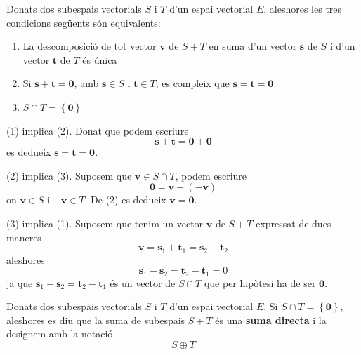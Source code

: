 \begin{teorema}
Donats dos subespais vectorials $S$ i $T$ d’un espai
vectorial $E$, aleshores les tres condicions següents són
equivalents:

\begin{enumerate}
\item La descomposició de tot vector $\mathbf{v}$ de $S+%
T$ en suma d’un vector $\mathbf{s}$ de $S$ i d’un vector 
$\mathbf{t}$ de $T$ és única

\item Si $\mathbf{s}+\mathbf{t}=\mathbf{0}$, amb $\mathbf{s}\in S$
i $\mathbf{t}\in T$, es compleix que $\mathbf{s}=\mathbf{t}=\mathbf{0}
$

\item $S\cap T=\left\{ \mathbf{0}\right\} $
\end{enumerate}

\end{teorema}
\begin{prova}
(1) implica (2). Donat que podem escriure%
\begin{equation*}
\mathbf{s}+\mathbf{t}=\mathbf{0}+\mathbf{0}
\end{equation*}%
es dedueix $\mathbf{s}=\mathbf{t}=\mathbf{0}$.

(2) implica (3). Suposem que $\mathbf{v}\in S\cap T$,
podem escriure%
\begin{equation*}
\mathbf{0}=\mathbf{v}+(-\mathbf{v})
\end{equation*}%
on $\mathbf{v}\in S$ i $-\mathbf{v}\in T$. De (2) es
dedueix $\mathbf{v}=\mathbf{0}$.

(3) implica (1). Suposem que tenim un vector $\mathbf{v}$ de $S%
+T$ expressat de dues maneres%
\begin{equation*}
\mathbf{v}=\mathbf{s}_{1}+\mathbf{t}_{1}=\mathbf{s}_{2}+\mathbf{t}_{2}
\end{equation*}%
aleshores%
\begin{equation*}
\mathbf{s}_{1}-\mathbf{s}_{2}=\mathbf{t}_{2}-\mathbf{t}_{1}=0
\end{equation*}%
ja que $\mathbf{s}_{1}-\mathbf{s}_{2}=\mathbf{t}_{2}-\mathbf{t}_{1}$ és un
vector de $S\cap T$ que per hipòtesi ha de ser $%
\mathbf{0}$.
\end{prova}

\begin{definicio}
Donats dos subespais vectorials $S$ i $T$ d’un espai
vectorial $E$. Si $S\cap T=\left\{ \mathbf{0}%
\right\} $, aleshores es diu que la suma de subespais $S+T$ és una \textbf{suma directa} i la designem amb la notació%
\begin{equation*}
S\oplus T
\end{equation*}
\end{definicio}

